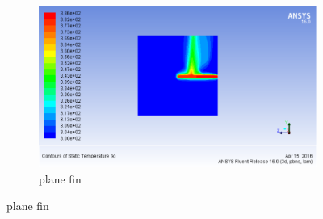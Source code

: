  \begin{figure}[h]
 	\centering
 	\begin{subfigure}[b]{0.5\textwidth}
 		\includegraphics[width=\textwidth]{110.png}
 		\caption{plane fin}
 		\label{fig:structured}
 	\end{subfigure}%
 	

\end{figure}
